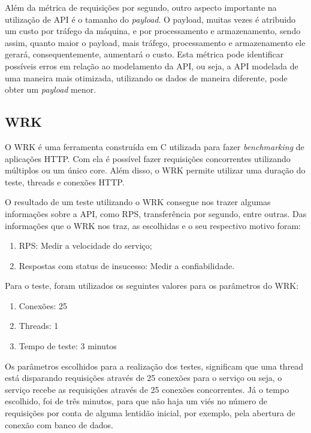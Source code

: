 Além da métrica de requisições por segundo, outro aspecto importante na utilização de API
é o tamanho do \textit{payload}. O payload, muitas vezes é atribuido um custo por 
tráfego da máquina, e por processamento e armazenamento, sendo assim, quanto maior
o payload, mais tráfego, processamento e armazenamento ele gerará, consequentemente,
aumentará o custo. Esta métrica pode identificar possíveis erros em relação 
ao modelamento da API, ou seja, a API modelada de uma maneira mais otimizada, utilizando os dados
de maneira diferente, pode obter um \textit{payload} menor.

\subsection{WRK}

O WRK é uma ferramenta construída em C utilizada para fazer \textit{benchmarking} de 
aplicações HTTP. Com ela é possível fazer requisições concorrentes utilizando 
múltiplos ou um único core. Além disso, o WRK permite utilizar uma duração
do teste, threads e conexões HTTP. 

O resultado de um teste utilizando o WRK consegue nos trazer algumas informações 
sobre a API, como RPS, transferência por segundo, entre outras. Das informações que
o WRK nos traz, as escolhidas e o seu respectivo motivo foram:

\begin{enumerate}
  \item RPS: Medir a velocidade do serviço;
  \item Respostas com status de insucesso: Medir a confiabilidade. 
\end{enumerate}

Para o teste, foram utilizados os seguintes valores para os parâmetros do WRK:

\begin{enumerate}
  \item Conexões: 25
  \item Threads: 1
  \item Tempo de teste: 3 minutos
\end{enumerate}

Os parâmetros escolhidos para a realização dos testes, significam que uma thread está disparando requisições através 
de 25 conexões para o serviço ou seja, o serviço recebe as requisições através de 25 conexões
concorrentes. Já o tempo escolhido, foi de três minutos, para que não haja um viés no número
de requisições por conta de alguma lentidão inicial, por exemplo, pela abertura de conexão com 
banco de dados.

